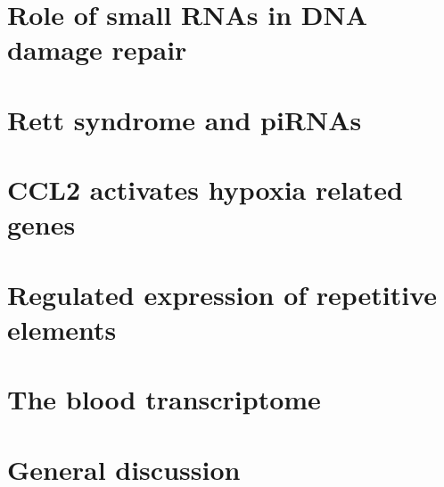 \documentclass[11pt,a4paper]{report}
\begin{document}
\chapter{Role of small RNAs in DNA damage repair}



\chapter{Rett syndrome and piRNAs}



\chapter{CCL2 activates hypoxia related genes}


\chapter{Regulated expression of repetitive elements}


\chapter{The blood transcriptome}


%

\chapter{General discussion}




\end{document}
